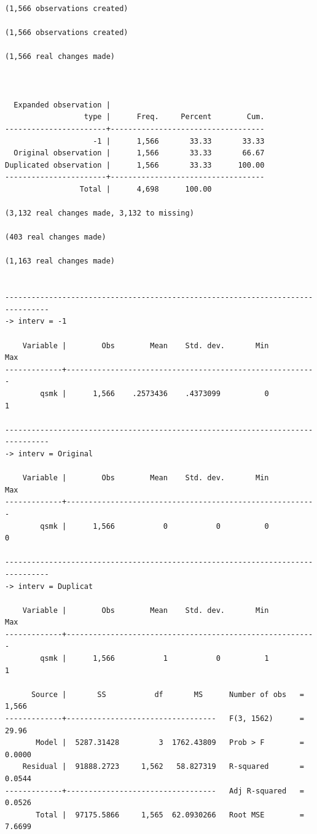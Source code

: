 \documentclass[
  10pt,
]{book}
\begin{document}
\begin{verbatim}
(1,566 observations created)

(1,566 observations created)

(1,566 real changes made)



  Expanded observation |
                  type |      Freq.     Percent        Cum.
-----------------------+-----------------------------------
                    -1 |      1,566       33.33       33.33
  Original observation |      1,566       33.33       66.67
Duplicated observation |      1,566       33.33      100.00
-----------------------+-----------------------------------
                 Total |      4,698      100.00

(3,132 real changes made, 3,132 to missing)

(403 real changes made)

(1,163 real changes made)


--------------------------------------------------------------------------------
-> interv = -1

    Variable |        Obs        Mean    Std. dev.       Min        Max
-------------+---------------------------------------------------------
        qsmk |      1,566    .2573436    .4373099          0          1

--------------------------------------------------------------------------------
-> interv = Original

    Variable |        Obs        Mean    Std. dev.       Min        Max
-------------+---------------------------------------------------------
        qsmk |      1,566           0           0          0          0

--------------------------------------------------------------------------------
-> interv = Duplicat

    Variable |        Obs        Mean    Std. dev.       Min        Max
-------------+---------------------------------------------------------
        qsmk |      1,566           1           0          1          1

      Source |       SS           df       MS      Number of obs   =     1,566
-------------+----------------------------------   F(3, 1562)      =     29.96
       Model |  5287.31428         3  1762.43809   Prob > F        =    0.0000
    Residual |  91888.2723     1,562   58.827319   R-squared       =    0.0544
-------------+----------------------------------   Adj R-squared   =    0.0526
       Total |  97175.5866     1,565  62.0930266   Root MSE        =    7.6699


\end{verbatim}
\end{document}
